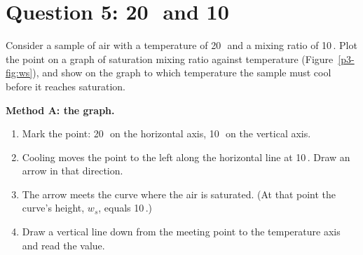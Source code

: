 \section{Question 5: 20\,\degC\ and 10\,\gkg}\label{p3-sec:q5}

\begin{questionbox}
Consider a sample of air with a temperature of 20\,\degC\ and a mixing ratio of 10\,\gkg. Plot the point on a graph of saturation mixing ratio against temperature (Figure~\ref{p3-fig:ws}), and show on the graph to which temperature the sample must cool before it reaches saturation.
\end{questionbox}

\textbf{Method A: the graph.}
\begin{enumerate}[label=\textbf{Step \arabic*.},leftmargin=*,itemsep=3pt]
\item Mark the point: 20\,\degC\ on the horizontal axis, 10\,\gkg\ on the vertical axis.
\item Cooling moves the point to the left along the horizontal line at 10\,\gkg. Draw an arrow in that direction.
\item The arrow meets the curve where the air is saturated. (At that point the curve's height, $w_s$, equals 10\,\gkg.)
\item Draw a vertical line down from the meeting point to the temperature axis and read the value.
\end{enumerate}

